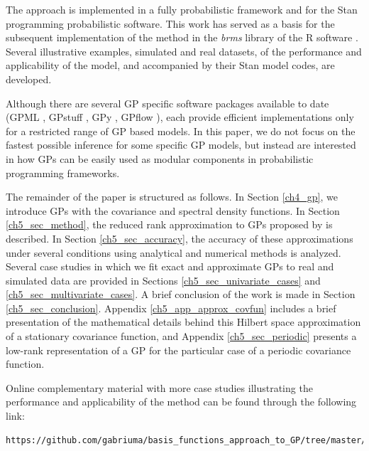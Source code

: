 \documentclass[onecolumn,a4paper,11pt]{article}
\begin{document}

The approach is implemented in a fully probabilistic framework and for the Stan programming probabilistic software. This work has served as a basis for the subsequent implementation of the method in the \textit{brms} library \citep{burkner2017brms} of the R software \citep{R2014R}. Several illustrative examples, simulated and real datasets, of the performance and applicability of the model, and accompanied by their Stan model codes, are developed. 

Although there are several GP specific software packages available to date (GPML \citep{rasmussen2010gpml},  GPstuff \citep{vanhatalo2013gpstuff}, GPy \citep{gpy2014}, GPflow \citep{GPflow2017}), each provide efficient implementations only for a restricted range of GP based models. In this paper, we do not focus on the fastest possible inference for some specific GP models, but instead are interested in how GPs can be easily used as modular components in probabilistic programming frameworks. 

The remainder of the paper is structured as follows. In Section \ref{ch4_gp}, we introduce GPs with the covariance and spectral density functions. In Section \ref{ch5_sec_method}, the reduced rank approximation to GPs proposed by \cite{solin2018hilbert} is described. In Section \ref{ch5_sec_accuracy}, the accuracy of these approximations under several conditions using analytical and numerical methods is analyzed. Several case studies in which we fit
exact and approximate GPs to real and simulated data are provided in Sections \ref{ch5_sec_univariate_cases} and \ref{ch5_sec_multivariate_cases}. A brief conclusion of the work is made in Section \ref{ch5_sec_conclusion}. Appendix \ref{ch5_app_approx_covfun} includes a brief presentation of the mathematical details behind this Hilbert space approximation of a stationary covariance function, and Appendix \ref{ch5_sec_periodic} presents a low-rank representation of a GP for the particular case of a periodic covariance function. 

Online complementary material with more case studies illustrating the performance and applicability of the method can be found through the following link:
%
\begin{lstlisting}[breaklines]
https://github.com/gabriuma/basis_functions_approach_to_GP/tree/master/Paper/online_appendices
\end{lstlisting}
\end{document}
